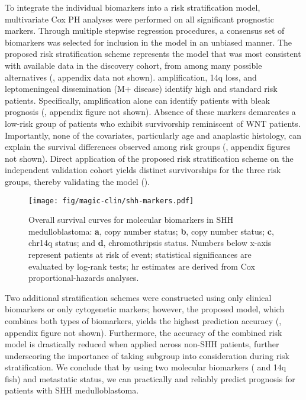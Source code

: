 To integrate the individual biomarkers into a risk stratification model, multivariate Cox PH analyses were performed on all significant prognostic markers. Through multiple stepwise regression procedures, a consensus set of biomarkers was selected for inclusion in the model in an unbiased manner. The proposed risk stratification scheme represents the model that was most consistent with available data in the discovery cohort, from among many possible alternatives (, appendix data not shown).  amplification, 14q loss, and leptomeningeal dissemination (M+ disease) identify high and standard risk patients. Specifically,  amplification alone can identify patients with bleak prognosis (, appendix figure not shown). Absence of these markers demarcates a low-risk group of patients who exhibit survivorship reminiscent of WNT patients. Importantly, none of the covariates, particularly age and anaplastic histology, can explain the survival differences observed among risk groups (, appendix figures not shown). Direct application of the proposed risk stratification scheme on the independent validation cohort yields distinct survivorships for the three risk groups, thereby validating the model ().

\begin{figure}[h]
	\begin{center}
		\texttt{[image: fig/magic-clin/shh-markers.pdf]}
	\end{center}
	\caption[Overall survival curves for molecular biomarkers in SHH medulloblastoma]
	{
	Overall survival curves for molecular biomarkers in SHH medulloblastoma:
	\textbf{a},  copy number status;
	\textbf{b},  copy number status;
	\textbf{c}, chr14q status; and
	\textbf{d}, chromothripsis status.
	Numbers below x-axis represent patients at risk of event; statistical significances are evaluated by log-rank tests; \gls{hr} estimates are derived from Cox proportional-hazards analyses.
	}
	\label{fig:shh-markers}
\end{figure}

Two additional stratification schemes were constructed using only clinical biomarkers or only cytogenetic markers; however, the proposed model, which combines both types of biomarkers, yields the highest prediction accuracy (, appendix figure not shown). Furthermore, the accuracy of the combined risk model is drastically reduced when applied across non-SHH patients, further underscoring the importance of taking subgroup into consideration during risk stratification. We conclude that by using two molecular biomarkers ( and 14q \gls{fish}) and metastatic status, we can practically and reliably predict prognosis for patients with SHH medulloblastoma.

